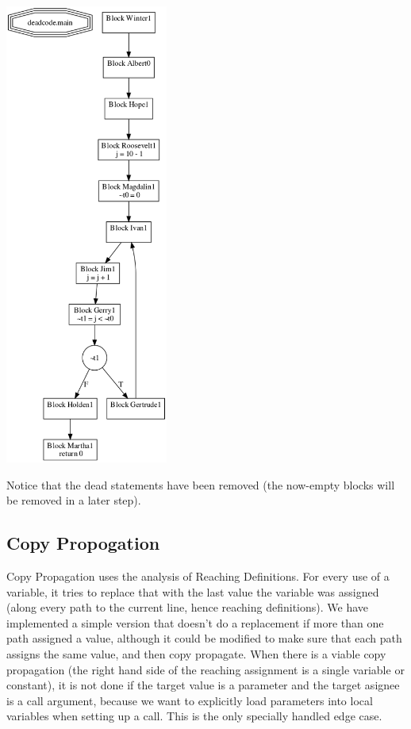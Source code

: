 \documentclass[11pt]{article}
\begin{document}
  \includegraphics[width=0.4\textwidth]{./after_deadcode_example.png}

  Notice that the dead statements have been removed (the now-empty blocks will be removed in a later step).


\subsection{Copy Propogation}
\label{sec-2.5}

  Copy Propagation uses the analysis of Reaching Definitions. For every use of a variable, it tries to
  replace that with the last value the variable was assigned (along every path to the current line, 
  hence reaching definitions). We have implemented a simple version that doesn't do a replacement if more
  than one path assigned a value, although it could be modified to make sure that each path assigns the same
  value, and then copy propagate. When there is a viable copy propagation (the right hand side of the reaching
  assignment is a single variable or constant), it is not done if the target value is a parameter and the 
  target asignee is a call argument, because we want to explicitly load parameters into local variables when 
  setting up a call. This is the only specially handled edge case.
\end{document}
